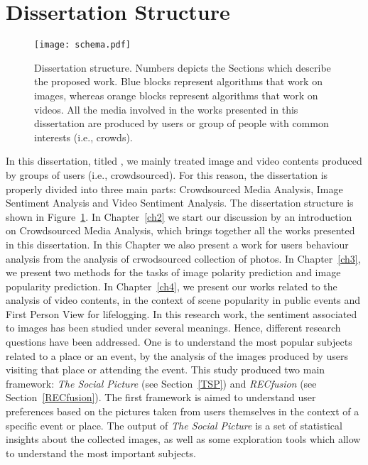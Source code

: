 \section{Dissertation Structure}
\begin{figure}[t]
	\centering
	\texttt{[image: schema.pdf]}
	\caption{Dissertation structure. Numbers depicts the Sections which describe the proposed work. Blue blocks represent algorithms that work on images, whereas orange blocks represent algorithms that work on videos. All the media involved in the works presented in this dissertation are produced by users or group of people with common interests (i.e., crowds).
	}
	\label{figDissertationSchema}
\end{figure}
In this dissertation, titled , we mainly treated image and video contents produced by groups of users (i.e., crowdsourced).
For this reason, the dissertation is properly divided into three main parts: Crowdsourced Media Analysis, Image Sentiment Analysis and Video Sentiment Analysis.
The dissertation structure is shown in Figure~\ref{figDissertationSchema}. In Chapter~\ref{ch2} we start our discussion by an introduction on Crowdsourced Media Analysis, which brings together all the works presented in this dissertation. In this Chapter we also present a work for users behaviour analysis from the analysis of crwodsourced collection of photos. %
In Chapter~\ref{ch3}, we present two methods for the tasks of image polarity prediction and image popularity prediction.
In Chapter~\ref{ch4}, we present our works related to the analysis of video contents, in the context of scene popularity in public events and First Person View for lifelogging.
In this research work, the sentiment associated to images has been studied under several meanings. Hence, different research questions have been addressed. 
One is to understand the most popular subjects related to a place or an event, by the analysis of the images produced by users visiting that place or attending the event. This study produced two main framework: \textit{The Social Picture} (see Section~\ref{TSP}) and \textit{RECfusion} (see Section~\ref{RECfusion}). The first framework is aimed to understand user preferences based on the pictures taken from users themselves in the context of a specific event or place. The output of \textit{The Social Picture} is a set of statistical insights about the collected images, as well as some exploration tools which allow to understand the most important subjects. 
